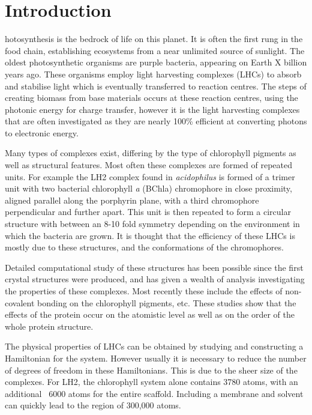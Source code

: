 %
%
\chapter{Introduction}
\label{chap:intro}

hotosynthesis is the bedrock of life on this planet. It is often the 
first rung in the food chain, establishing ecosystems from a near unlimited source 
of sunlight. The oldest photosynthetic organisms are purple bacteria, appearing
on Earth X billion years ago. These organisms employ light harvesting complexes (LHCs) 
to absorb and stabilise light which is eventually transferred to reaction centres.
The steps of creating biomass from base materials occurs at these reaction centres,
using the photonic energy for charge transfer, however it is the light harvesting
complexes that are often investigated as they are nearly 100\% efficient at converting
photons to electronic energy.

Many types of complexes exist, differing by the type of chlorophyll pigments as 
well as structural features. Most often these complexes are formed of repeated units.
For example the LH2 complex found in \emph{acidophilus} is formed of a trimer unit
with two bacterial chlorophyll \emph{a} (BChla) chromophore in close proximity, 
aligned parallel along the porphyrin plane, with a third chromophore perpendicular
and further apart. This unit is then repeated to form a circular structure with
between an 8-10 fold symmetry depending on the environment in which the bacteria
are grown. It is thought that the efficiency of these LHCs is mostly due to these
structures, and the conformations of the chromophores.

Detailed computational study of these structures has been possible since the first
crystal structures were produced, and has given a wealth of analysis investigating 
the properties of these complexes. Most recently these include the effects of non-covalent
bonding on the chlorophyll pigments, etc. These studies show that the effects of
the protein occur on the atomistic level as well as on the order of the whole protein 
structure.

The physical properties of LHCs can be obtained by studying and constructing a Hamiltonian 
for the system. However usually it is necessary to reduce the number of degrees 
of freedom in these Hamiltonians. This is due to the sheer size of the complexes.
For LH2, the chlorophyll system alone contains 3780 atoms, with an additional 
~6000 atoms for the entire scaffold. Including a membrane and solvent can quickly
lead to the region of 300,000 atoms.

